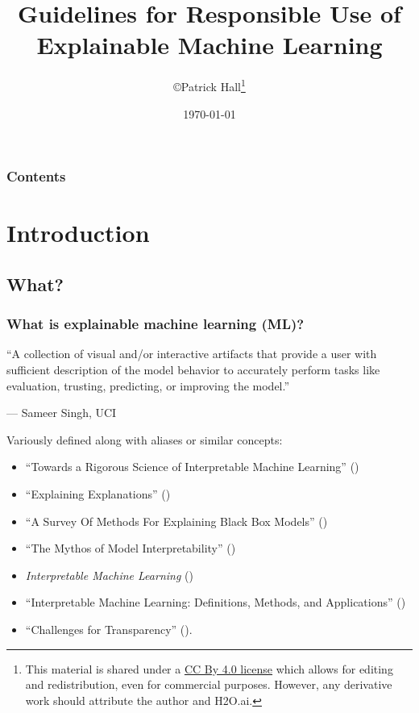 \documentclass[11pt,
               aspectratio=169,
               hyperref={colorlinks}
               ]{beamer}
\author{\copyright\hspace{1pt}Patrick Hall\footnote{\tiny{This material is shared under a \href{https://creativecommons.org/licenses/by/4.0/deed.ast}{CC By 4.0 license} which allows for editing and redistribution, even for commercial purposes. However, any derivative work should attribute the author and H2O.ai.}}}
\title{Guidelines for Responsible Use of Explainable Machine Learning}
\institute{\href{https://www.h2o.ai}{H\textsubscript{2}O.ai}}
\date{\today}
\begin{document}
	
	\maketitle
	
	\begin{frame}
	
		\frametitle{Contents}
		
		\tableofcontents{}
		
	\end{frame}

	\section{Introduction}

	\subsection{What?}

	\begin{frame}[t]
		
		\frametitle{What is explainable machine learning (ML)?}
		
		\epigraph{“A collection of visual and/or interactive artifacts that provide a user with sufficient description of the model behavior to accurately perform tasks like evaluation, trusting, predicting, or improving the model.”}{--- \textup{Sameer Singh}, UCI}		
		
		\scriptsize Variously defined along with aliases or similar concepts:
		\begin{itemize}\scriptsize
			\item ``Towards a Rigorous Science of Interpretable Machine Learning'' (\citet{been_kim1})
			\item ``Explaining Explanations'' (\citet{gilpin2018explaining})
			\item ``A Survey Of Methods For Explaining Black Box Models'' (\citet{guidotti2018survey})
			\item ``The Mythos of Model Interpretability'' (\citet{lipton1})
		 	\item \textit{Interpretable Machine Learning} (\citet{molnar})
			\item ``Interpretable Machine Learning: Definitions, Methods, and Applications'' (\citet{murdoch2019interpretable})
			\item ``Challenges for Transparency'' (\citet{weller2017challenges}). 
		\end{itemize}\normalsize
		
	\end{frame}
	
\end{document}
